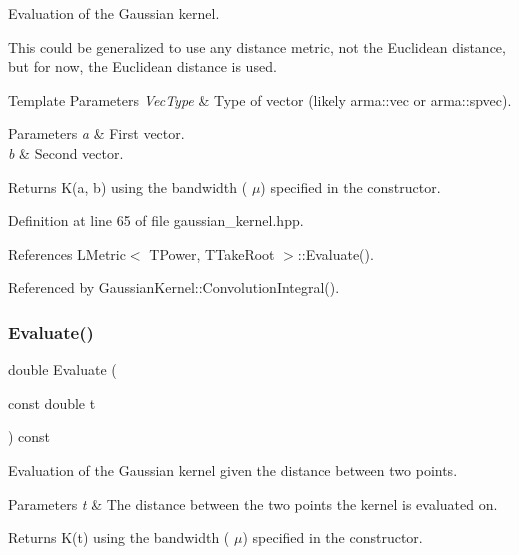 Evaluation of the Gaussian kernel. 

This could be generalized to use any distance metric, not the Euclidean distance, but for now, the Euclidean distance is used.


\begin{DoxyTemplParams}{Template Parameters}
{\em Vec\+Type} & Type of vector (likely arma\+::vec or arma\+::spvec). \\
\hline
\end{DoxyTemplParams}

\begin{DoxyParams}{Parameters}
{\em a} & First vector. \\
\hline
{\em b} & Second vector. \\
\hline
\end{DoxyParams}
\begin{DoxyReturn}{Returns}
K(a, b) using the bandwidth ( $\mu$) specified in the constructor. 
\end{DoxyReturn}


Definition at line 65 of file gaussian\+\_\+kernel.\+hpp.



References L\+Metric$<$ T\+Power, T\+Take\+Root $>$\+::\+Evaluate().



Referenced by Gaussian\+Kernel\+::\+Convolution\+Integral().

\mbox{\label{classmlpack_1_1kernel_1_1GaussianKernel_a031ed73efe13c6e6bc805006bd249238}} 
\subsubsection{Evaluate()\hspace{0.1cm}{\footnotesize\ttfamily [2/2]}}
{\footnotesize\ttfamily double Evaluate (\begin{DoxyParamCaption}\item[{const double}]{t }\end{DoxyParamCaption}) const\hspace{0.3cm}{\ttfamily [inline]}}



Evaluation of the Gaussian kernel given the distance between two points. 


\begin{DoxyParams}{Parameters}
{\em t} & The distance between the two points the kernel is evaluated on. \\
\hline
\end{DoxyParams}
\begin{DoxyReturn}{Returns}
K(t) using the bandwidth ( $\mu$) specified in the constructor. 
\end{DoxyReturn}



